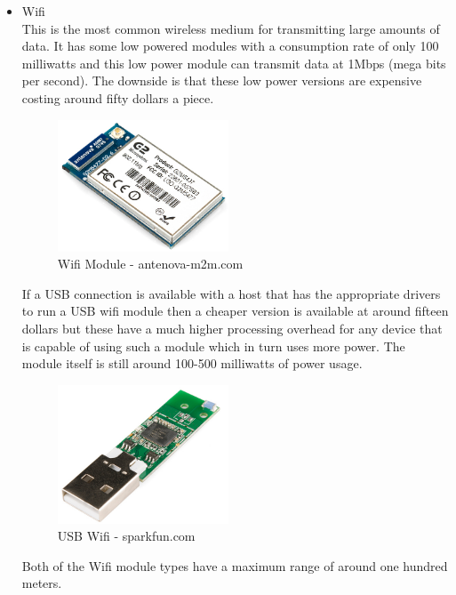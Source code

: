 \begin{itemize}
\item Wifi
\\This is the most common wireless medium for transmitting large amounts of data.  It has some low powered modules with a consumption rate of only 100 milliwatts and this low power module can transmit data at 1Mbps (mega bits per second).  The downside is that these low power versions are expensive costing around fifty dollars a piece.
\begin{figure}[H]
\centering
        \includegraphics[width=2.0in] {Images/wifi-module.jpg}
        \caption{Wifi Module - antenova-m2m.com}
        \label{Wifi Module}
\end{figure}
If a USB connection is available with a host that has the appropriate drivers to run a USB wifi module then a cheaper version is available at around fifteen dollars but these have a much higher processing overhead for any device that is capable of using such a module which in turn uses more power.  The module itself is still around 100-500 milliwatts of power usage.
\begin{figure}[H]
\centering
        \includegraphics[width=2.0in] {Images/usb-wifi.jpg}
        \caption{USB Wifi - sparkfun.com}
        \label{Usb Wifi}
\end{figure}
Both of the Wifi module types have a maximum range of around one hundred meters.


\end{itemize}
